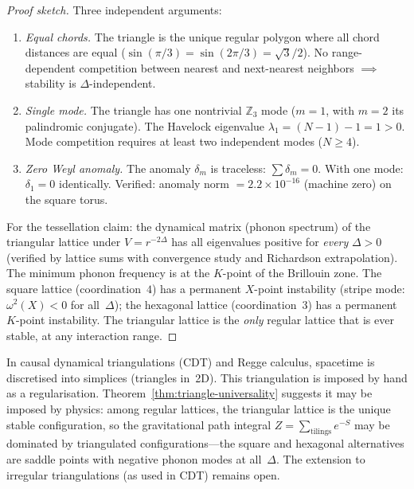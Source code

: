 \begin{proof}[Proof sketch]
Three independent arguments:
\begin{enumerate}
\item \emph{Equal chords.} The triangle is the unique regular polygon
  where all chord distances are equal
  ($\sin(\pi/3) = \sin(2\pi/3) = \sqrt{3}/2$).
  No range-dependent competition between nearest and next-nearest
  neighbors $\implies$ stability is $\Delta$-independent.

\item \emph{Single mode.} The triangle has one nontrivial $\mathbb{Z}_3$
  mode ($m = 1$, with $m = 2$ its palindromic conjugate).
  The Havelock eigenvalue $\lambda_1 = (N{-}1) - 1 = 1 > 0$.
  Mode competition requires at least two independent modes ($N \ge 4$).

\item \emph{Zero Weyl anomaly.}
  The anomaly $\delta_m$ is traceless: $\sum \delta_m = 0$.
  With one mode: $\delta_1 = 0$ identically.
  Verified: anomaly norm $= 2.2 \times 10^{-16}$ (machine zero) on
  the square torus.
\end{enumerate}
For the tessellation claim: the dynamical matrix (phonon spectrum)
of the triangular lattice under $V = r^{-2\Delta}$ has all eigenvalues
positive for \emph{every} $\Delta > 0$ (verified by lattice sums with
convergence study and Richardson extrapolation).
The minimum phonon frequency is at the $K$-point of the Brillouin zone.
The square lattice (coordination~$4$) has a permanent $X$-point
instability (stripe mode: $\omega^2(X) < 0$ for all~$\Delta$);
the hexagonal lattice (coordination~$3$) has a permanent $K$-point
instability. The triangular lattice is the \emph{only} regular
lattice that is ever stable, at any interaction range.
\end{proof}

\begin{remark}
\label{rmk:cdt}
In causal dynamical triangulations (CDT) and Regge calculus,
spacetime is discretised into simplices (triangles in~2D).
This triangulation is imposed by hand as a regularisation.
Theorem~\ref{thm:triangle-universality} suggests it may be imposed
by physics: among regular lattices, the triangular lattice is the
unique stable configuration, so the gravitational path integral
$Z = \sum_{\text{tilings}} e^{-S}$ may be dominated by
triangulated configurations---the square and hexagonal alternatives
are saddle points with negative phonon modes at all~$\Delta$.
The extension to irregular triangulations (as used in CDT)
remains open.
\end{remark}

